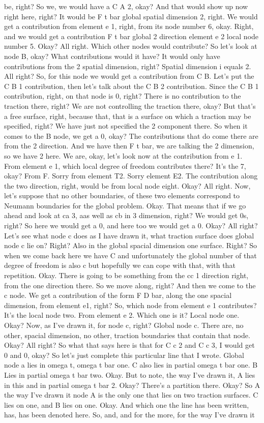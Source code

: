 \documentclass[10pt]{article}
\begin{document}
be, right? So we, we would have a C A 2, okay? And that would show up now right here, right? It would be F t bar global spatial dimension 2, right. We would get a contribution from element e 1, right, from its node number 6, okay. Right, and we would get a contribution F t bar global 2 direction element e 2 local node number 5. Okay? All right. Which other nodes would contribute? So let's look at node B, okay? What contributions would it have? It would only have contributions from the 2 spatial dimension, right? Spatial dimension i equals 2. All right? So, for this node we would get a contribution from C B. Let's put the C B 1 contribution, then let's talk about the C B 2 contribution. Since the C B 1 contribution, right, on that node is 0, right? There is no contribution to the traction there, right? We are not controlling the traction there, okay? But that's a free surface, right, because that, that is a surface on which a traction may be specified, right? We have just not specified the 2 component there. So when it comes to the B node, we get a 0, okay? The contributions that do come there are from the 2 direction. And we have then F t bar, we are talking the 2 dimension, so we have 2 here. We are, okay, let's look now at the contribution from e 1. From element e 1, which local degree of freedom contributes there? It's the 7, okay? From F. Sorry from element T2. Sorry element E2. The contribution along the two direction, right, would be from local node eight. Okay? All right. Now, let's suppose that no other boundaries, of these two elements correspond to Neumann boundaries for the global problem. Okay. That means that if we go ahead and look at ca 3, aas well as cb in 3 dimension, right? We would get 0s, right? So here we would get a 0, and here too we would get a 0. Okay? All right? Let's see what node c does as I have drawn it, what traction surface does global node c lie on? Right? Also in the global spacial dimension one surface. Right? So when we come back here we have C and unfortunately the global  number of that degree of freedom is also c but hopefully we can cope with that, with that repetition. Okay. There is going to be something from the cc 1 direction right, from the one direction there. So we move along, right? And then we come to the c node. We get a contribution of the form F D bar, along the one spacial dimension, from element e1, right? So, which node from element e 1 contributes? It's the local node two. From element e 2. Which one is it? Local node one. Okay? Now, as I've drawn it, for node c, right? Global node c. There are, no other, spacial dimension, no other, traction boundaries that contain that node. Okay? All right? So what that says here is that for C c 2 and C c 3, I would get 0 and 0, okay? So let's just complete this particular line that I wrote. Global node a lies in omega t, omega t bar one. C also lies in partial omega t bar one. B Lies in partial omega t bar two. Okay. But to note, the way I've drawn it, A lies in this and in partial omega t bar 2. Okay? There's a partition there. Okay? So A the way I've drawn it node A is the only one that lies on two traction surfaces. C lies on one, and B lies on one. Okay. And which one the line has been written, has, has been denoted here. So, and, and for the more, for the way I've drawn it 
\end{document}
